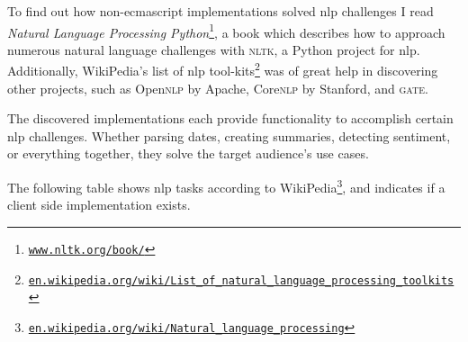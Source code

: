 To find out how non-\gls{ecmascript} implementations solved \gls{nlp}
  challenges I read \emph{Natural Language Processing
  Python}\footnote{
    \href{http://www.nltk.org/book/}{\nolinkurl{www.nltk.org/book/}}
  }, a book which describes how to approach numerous natural language
  challenges with \textsc{nltk}, a Python project for \gls{nlp}.
Additionally, WikiPedia's list of \gls{nlp} tool-kits\footnote{
    \href{http://en.wikipedia.org/wiki/List_of_natural_language_processing_toolkits}{\nolinkurl{en.wikipedia.org/wiki/List_of_natural_language_processing_toolkits}}
  } was of great help in discovering other projects, such as Open\textsc{nlp}
  by Apache, Core\textsc{nlp} by Stanford, and \textsc{gate}.

The discovered implementations each provide functionality to accomplish
  certain \gls{nlp} challenges.
Whether parsing dates, creating summaries, detecting sentiment, or everything
  together, they solve the target audience's use cases.

The following table shows \gls{nlp} tasks according to
  WikiPedia\footnote{
    \href{http://en.wikipedia.org/wiki/Natural_language_processing}{\nolinkurl{en.wikipedia.org/wiki/Natural_language_processing}}
  }, and indicates if a client side implementation exists.
\medskip

